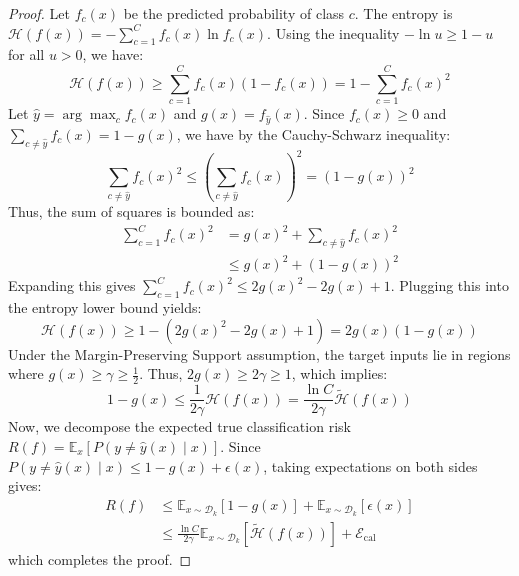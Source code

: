 \begin{proof}
Let $f_c(x)$ be the predicted probability of class $c$. The entropy is
$\mathcal{H}(f(x)) = -\sum_{c=1}^C f_c(x) \ln f_c(x)$. Using the inequality
$-\ln u \ge 1-u$ for all $u > 0$, we have:
\begin{equation}
\mathcal{H}(f(x)) \ge \sum_{c=1}^C f_c(x)(1 - f_c(x)) = 1 - \sum_{c=1}^C f_c(x)^2
\end{equation}
Let $\hat{y} = \arg\max_c f_c(x)$ and $g(x) = f_{\hat{y}}(x)$. Since $f_c(x) \ge
0$ and $\sum_{c \neq \hat{y}} f_c(x) = 1 - g(x)$, we have by the Cauchy-Schwarz
inequality:
\begin{equation}
\sum_{c \neq \hat{y}} f_c(x)^2 \le \left(\sum_{c \neq \hat{y}} f_c(x)\right)^2 = (1 - g(x))^2
\end{equation}
Thus, the sum of squares is bounded as:
\begin{equation}
\begin{aligned}
\sum_{c=1}^C f_c(x)^2 &= g(x)^2 + \sum_{c \neq \hat{y}} f_c(x)^2 \\
&\le g(x)^2 + (1 - g(x))^2
\end{aligned}
\end{equation}
Expanding this gives $\sum_{c=1}^C f_c(x)^2 \le 2g(x)^2 - 2g(x) + 1$. Plugging
this into the entropy lower bound yields:
\begin{equation}
\mathcal{H}(f(x)) \ge 1 - (2g(x)^2 - 2g(x) + 1) = 2g(x)(1 - g(x))
\end{equation}
Under the Margin-Preserving Support assumption, the target inputs lie in regions
where $g(x) \ge \gamma \ge \frac{1}{2}$. Thus, $2g(x) \ge 2\gamma \ge 1$, which
implies:
\begin{equation}
1 - g(x) \le \frac{1}{2\gamma} \mathcal{H}(f(x)) = \frac{\ln C}{2\gamma} \tilde{\mathcal{H}}(f(x))
\end{equation}
Now, we decompose the expected true classification risk $R(f) = \mathbb{E}_x
[P(y \neq \hat{y}(x) \mid x)]$. Since $P(y \neq \hat{y}(x) \mid x) \le 1 - g(x)
+ \epsilon(x)$, taking expectations on both sides gives:
\begin{equation}
\begin{aligned}
R(f) &\le \mathbb{E}_{x \sim \mathcal{D}_k}[1 - g(x)] + \mathbb{E}_{x \sim
\mathcal{D}_k}[\epsilon(x)] \\
&\le \frac{\ln C}{2\gamma} \mathbb{E}_{x \sim
\mathcal{D}_k}[\tilde{\mathcal{H}}(f(x))] + \mathcal{E}_{\text{cal}}
\end{aligned}
\end{equation}
which completes the proof.
\end{proof}

